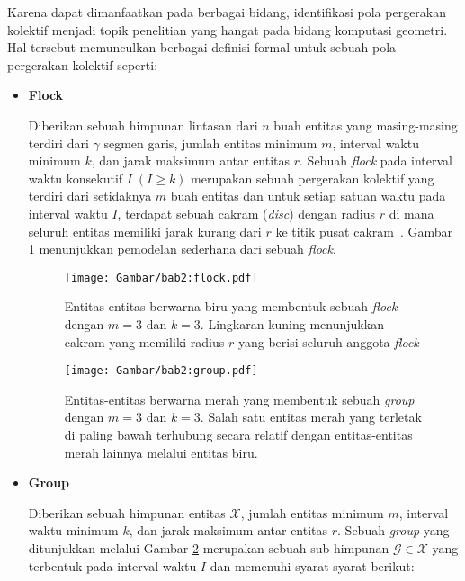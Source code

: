 Karena dapat dimanfaatkan pada berbagai bidang, identifikasi pola pergerakan kolektif menjadi topik penelitian yang hangat pada bidang komputasi geometri. Hal tersebut memunculkan berbagai definisi formal untuk sebuah pola pergerakan kolektif seperti:

\begin{itemize}
    \item \textbf{Flock}
    
    Diberikan sebuah himpunan lintasan dari $n$ buah entitas yang masing-masing terdiri dari $\gamma$ segmen garis, jumlah entitas minimum $m$, interval waktu minimum $k$, dan jarak maksimum antar entitas $r$. Sebuah \textit{flock} pada interval waktu konsekutif $I\;(I \geq k)$ merupakan sebuah pergerakan kolektif yang terdiri dari setidaknya $m$ buah entitas dan untuk setiap satuan waktu pada interval waktu $I$, terdapat sebuah cakram (\textit{disc}) dengan radius $r$ di mana seluruh entitas memiliki jarak kurang dari $r$ ke titik pusat cakram~\cite{gudmundsson:flock}. Gambar \ref{bab2:flock} menunjukkan pemodelan sederhana dari sebuah \textit{flock}.
    
    \begin{figure}[h]
        \centering
        \captionsetup{width=0.75\textwidth}
        \texttt{[image: Gambar/bab2:flock.pdf]}
        \caption[Sebuah \textit{flock}]{Entitas-entitas berwarna biru yang membentuk sebuah \textit{flock} dengan $m = 3$ dan $k = 3$. Lingkaran kuning menunjukkan cakram yang memiliki radius $r$ yang berisi seluruh anggota \textit{flock}}
        \label{bab2:flock}
    \end{figure}
    
    \begin{figure}[h]
        \centering
        \captionsetup{width=0.75\textwidth}
        \texttt{[image: Gambar/bab2:group.pdf]}
        \caption[Sebuah \textit{group}]{Entitas-entitas berwarna merah yang membentuk sebuah \textit{group} dengan $m = 3$ dan $k = 3$. Salah satu entitas merah yang terletak di paling bawah terhubung secara relatif dengan entitas-entitas merah lainnya melalui entitas biru.}
        \label{bab2:group}
    \end{figure}
    
    \item \textbf{Group}
    
    Diberikan sebuah himpunan entitas $\mathcal{X}$, jumlah entitas minimum $m$, interval waktu minimum $k$, dan jarak maksimum antar entitas $r$. Sebuah \textit{group} yang ditunjukkan melalui Gambar \ref{bab2:group} merupakan sebuah sub-himpunan $\mathcal{G} \in \mathcal{X}$ yang terbentuk pada interval waktu $I$ dan memenuhi syarat-syarat berikut:
    

\end{itemize}
